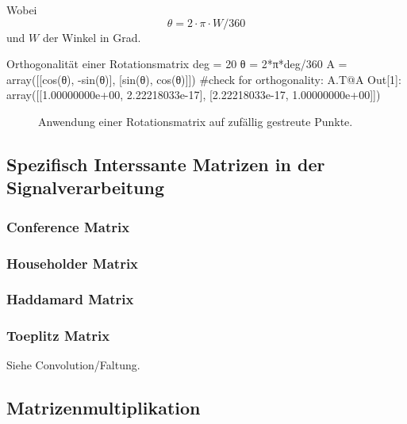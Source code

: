 Wobei $$\theta = 2\cdot \pi \cdot W / 360$$ und $W$ der Winkel in Grad.

\begin{python}{Orthogonalität einer Rotationsmatrix}
deg = 20
θ = 2*π*deg/360 
A = array([[cos(θ), -sin(θ)],
           [sin(θ), cos(θ)]])
#check for orthogonality:
A.T@A
Out[1]: array([[1.00000000e+00, 2.22218033e-17],
       [2.22218033e-17, 1.00000000e+00]])

\end{python}



\begin{figure}[H]
    \centering
    
    \caption{Anwendung einer Rotationsmatrix auf zufällig gestreute Punkte.}
    \label{fig:rotMat}
\end{figure}





\subsection{Spezifisch Interssante Matrizen in der Signalverarbeitung}

\subsubsection*{Conference Matrix}
\subsubsection*{Householder Matrix}
\subsubsection*{Haddamard Matrix}
\subsubsection*{Toeplitz Matrix}\label{subsub:toeplitz}
Siehe Convolution/Faltung.


\subsection*{Matrizenmultiplikation}

